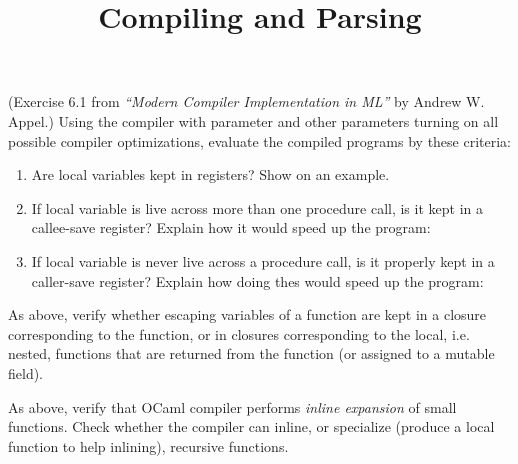 \documentclass{article}
\newcommand{\tmem}[1]{{\em #1\/}}
\newcommand{\tmverbatim}[1]{\text{{\ttfamily{#1}}}}
{\theorembodyfont{\rmfamily\small}\newtheorem{exercise}{Exercise}}
\begin{document}
{}

{\title{Compiling and Parsing}}

\begin{exercise}
  (Exercise 6.1 from {\tmem{``Modern Compiler Implementation in ML''}} by
  Andrew W. Appel.) Using the \tmverbatim{ocamlopt} compiler with parameter
  \tmverbatim{-S} and other parameters turning on all possible compiler
  optimizations, evaluate the compiled programs by these criteria:
  \begin{enumerate}
    \item Are local variables kept in registers? Show on an example.
    
    \item If local variable \tmverbatim{b} is live across more than one
    procedure call, is it kept in a callee-save register? Explain how it would
    speed up the program:\\
    {}{}{\hlopt{= }}{}{}{\hlopt{= }}{}{\hlopt{+}}{}{}{}{\hlopt{= }}{}{\hlopt{() }}{}{}{\hlopt{= }}{}{}{}{\hlopt{+}}{}{\hlendline{}}
    
    \item If local variable \tmverbatim{x} is never live across a procedure
    call, is it properly kept in a caller-save register? Explain how doing
    thes would speed up the program:\\
    {}{}{\hlopt{= }}{}{}{\hlopt{= }}{}{\hlopt{+}}{}{}{}{\hlopt{= }}{}{}{}{\hlendline{}}
  \end{enumerate}
\end{exercise}

\begin{exercise}
  As above, verify whether escaping variables of a function are kept in a
  closure corresponding to the function, or in closures corresponding to the
  local, i.e. nested, functions that are returned from the function (or
  assigned to a mutable field).
\end{exercise}

\begin{exercise}
  As above, verify that OCaml compiler performs {\tmem{inline expansion}} of
  small functions. Check whether the compiler can inline, or specialize
  (produce a local function to help inlining), recursive functions.
\end{exercise}
\end{document}
